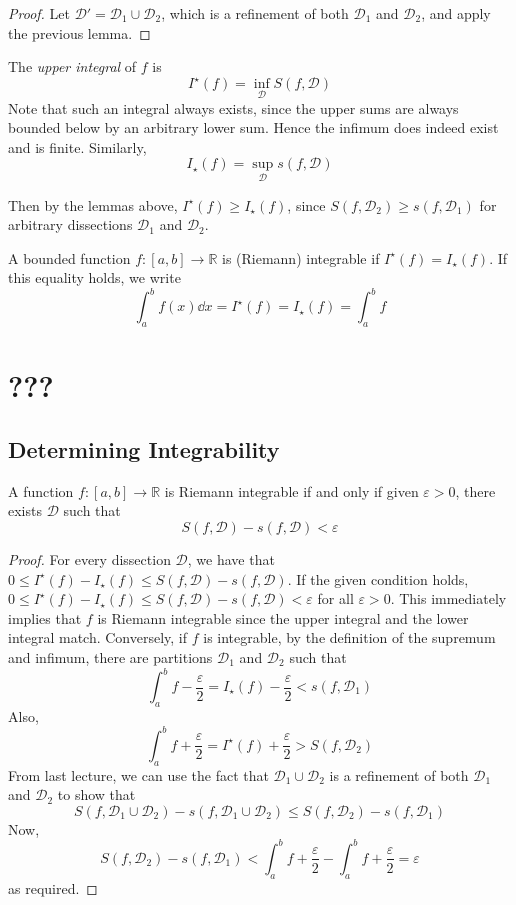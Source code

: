 \documentclass{article}
\begin{document}
\begin{proof}
    Let $\mathcal D' = \mathcal D_1 \cup \mathcal D_2$, which is a refinement of both $\mathcal D_1$ and $\mathcal D_2$, and apply the previous lemma.
\end{proof}
\begin{definition}
    The \textit{upper integral} of $f$ is
    \[ I^\star(f) = \inf_{\mathcal D} S(f, \mathcal D) \]
    Note that such an integral always exists, since the upper sums are always bounded below by an arbitrary lower sum. Hence the infimum does indeed exist and is finite. Similarly,
    \[ I_\star(f) = \sup_{\mathcal D} s(f, \mathcal D) \]
\end{definition}
\noindent Then by the lemmas above, $I^\star(f) \geq I_\star(f)$, since $S(f, \mathcal D_2) \geq s(f, \mathcal D_1)$ for arbitrary dissections $\mathcal D_1$ and $\mathcal D_2$.
\begin{definition}
    A bounded function $f \colon [a, b] \to \mathbb R$ is (Riemann) integrable if $I^\star(f) = I_\star(f)$. If this equality holds, we write
    \[ \int_a^b f(x) \dd{x} = I^\star(f) = I_\star(f) = \int_a^b f \]
\end{definition}

\section{???}
\subsection{Determining Integrability}
\begin{theorem}
    A function $f \colon [a, b] \to \mathbb R$ is Riemann integrable if and only if given $\varepsilon > 0$, there exists $\mathcal D$ such that
\[ S(f, \mathcal D) - s(f, \mathcal D) < \varepsilon \]
\end{theorem}
\begin{proof}
    For every dissection $\mathcal D$, we have that $0 \leq I^\star(f) - I_\star(f) \leq S(f, \mathcal D) - s(f, \mathcal D)$. If the given condition holds, $0 \leq I^\star(f) - I_\star(f) \leq S(f, \mathcal D) - s(f, \mathcal D) < \varepsilon$ for all $\varepsilon > 0$. This immediately implies that $f$ is Riemann integrable since the upper integral and the lower integral match. Conversely, if $f$ is integrable, by the definition of the supremum and infimum, there are partitions $\mathcal D_1$ and $\mathcal D_2$ such that
    \[ \int_a^b f - \frac{\varepsilon}{2} = I_\star(f) - \frac{\varepsilon}{2} < s(f, \mathcal D_1) \]
    Also,
    \[ \int_a^b f + \frac{\varepsilon}{2} = I^\star(f) + \frac{\varepsilon}{2} > S(f, \mathcal D_2) \]
    From last lecture, we can use the fact that $\mathcal D_1 \cup \mathcal D_2$ is a refinement of both $\mathcal D_1$ and $\mathcal D_2$ to show that
    \[ S(f, \mathcal D_1 \cup \mathcal D_2) - s(f, \mathcal D_1 \cup \mathcal D_2) \leq S(f, \mathcal D_2) - s(f, \mathcal D_1) \]
    Now,
    \[ S(f, \mathcal D_2) - s(f, \mathcal D_1) < \int_a^b f + \frac{\varepsilon}{2} - \int_a^b f + \frac{\varepsilon}{2} = \varepsilon \]
    as required.
\end{proof}
\end{document}

